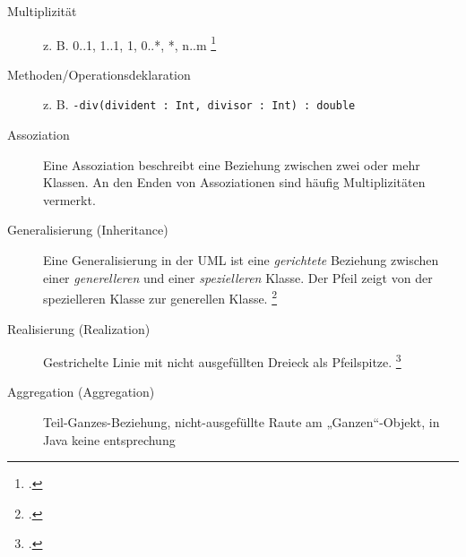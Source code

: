 \documentclass{lehramt-informatik-haupt}
\begin{document}
\begin{description}
\item[Multiplizität]
z. B. 0..1, 1..1, 1, 0..*, *, n..m
\footcite[Seite 98 (PDF 115)]{uml}

%

\item[Methoden/Operationsdeklaration]
z. B. \verb|-div(divident : Int, divisor : Int) : double|

%

\item[Assoziation] Eine Assoziation beschreibt eine Beziehung zwischen
zwei oder mehr Klassen. An den Enden von Assoziationen sind häufig
Multiplizitäten vermerkt.


%

\item[Generalisierung (Inheritance)] Eine Generalisierung in der UML ist
eine \emph{gerichtete} Beziehung zwischen einer \emph{generelleren} und
einer \emph{spezielleren} Klasse. Der Pfeil zeigt von der spezielleren
Klasse zur generellen Klasse.
\footcite[Kapitel 6.4.6 Generalisierung, Seite 135]{rupp}


\item[Realisierung (Realization)] Gestrichelte Linie mit nicht
ausgefüllten Dreieck als Pfeilspitze. 
\footcite[Kapitel 6.4.13, Seite 164]{rupp}


%

\item[Aggregation (Aggregation)]
Teil-Ganzes-Beziehung, nicht-ausgefüllte Raute am „Ganzen“-Objekt,
in Java keine entsprechung



\end{description}
\end{document}
